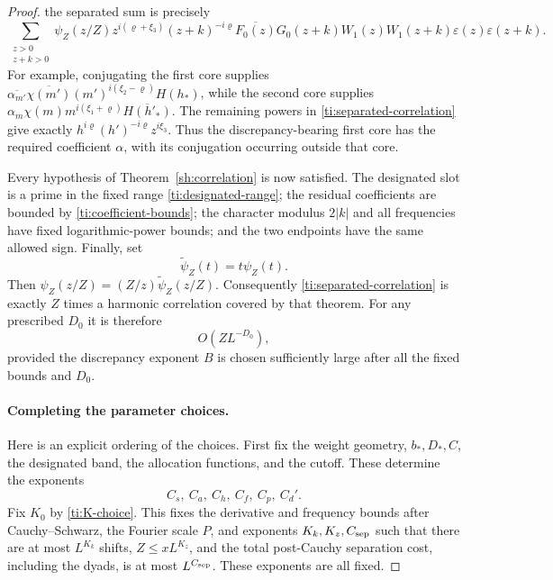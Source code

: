 \begin{proof}
the separated sum is precisely
\begin{equation}\label{ti:separated-correlation}
 \sum_{\substack{z>0\\z+k>0}}
  \psi_Z(z/Z)z^{i(\varrho+\xi_3)}(z+k)^{-i\varrho}
       \overline{F_0(z)}G_0(z+k)
       W_1(z)W_1(z+k)\varepsilon(z)\varepsilon(z+k).
\end{equation}
For example, conjugating the first core supplies
$\overline{\alpha_{m'}}\overline{\chi(m')}
(m')^{i(\xi_2-\varrho)}H(h_*)$, while the second core supplies
$\alpha_m\chi(m)m^{i(\xi_1+\varrho)}\overline{H(h'_*)}$.
The remaining powers in \eqref{ti:separated-correlation} give exactly
$h^{i\varrho}(h')^{-i\varrho}z^{i\xi_3}$.
Thus the discrepancy-bearing first core has the required coefficient
$\alpha$, with its conjugation occurring outside that core.

Every hypothesis of Theorem~\ref{sh:correlation} is now satisfied.
The designated slot is a prime in the fixed range
\eqref{ti:designated-range}; the residual coefficients are bounded
by \eqref{ti:coefficient-bounds}; the character modulus $2|k|$ and
all frequencies have fixed logarithmic-power bounds; and the two
endpoints have the same allowed sign. Finally, set
\[
                    \widetilde\psi_Z(t)=t\psi_Z(t).
\]
Then $\psi_Z(z/Z)=(Z/z)\widetilde\psi_Z(z/Z)$. Consequently
\eqref{ti:separated-correlation} is exactly $Z$ times a harmonic
correlation covered by that theorem. For any prescribed $D_0$ it is
therefore
\begin{equation}\label{ti:correlation-bound}
                              O(ZL^{-D_0}),
\end{equation}
provided the discrepancy exponent $B$ is chosen sufficiently large
after all the fixed bounds and $D_0$.

\paragraph{Completing the parameter choices.}
Here is an explicit ordering of the choices. First fix the weight
geometry, $b_*,D_*,C$, the designated band, the allocation functions,
and the cutoff. These determine the exponents
\[
 C_s,\ C_a,\ C_h,\ C_f,\ C_p,\ C_d'.
\]
Fix $K_0$ by
\eqref{ti:K-choice}. This fixes the derivative and frequency bounds
after Cauchy--Schwarz, the Fourier scale $P$, and exponents
$K_k,K_z,C_{\rm sep}$ such that there are at most $L^{K_k}$ shifts,
$Z\le xL^{K_z}$, and the total post-Cauchy separation cost, including
the dyads, is at most $L^{C_{\rm sep}}$. These exponents are all fixed.


\end{proof}
